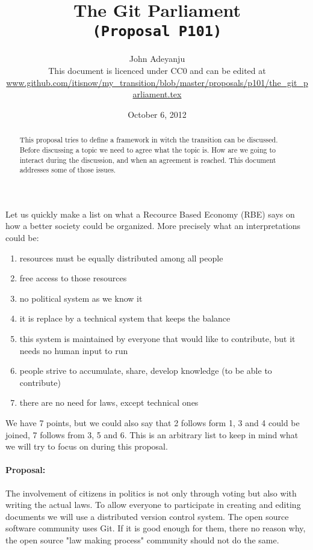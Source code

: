 \documentclass{article}
\begin{document}
\title{The Git Parliament\\\tt{\small{(Proposal P101)}}\\\tt{\small{}}}%
\author{John Adeyanju\\\small{This document is licenced under CC0 and can be edited at}\\ \scriptsize{\url{www.github.com/itisnow/my_transition/blob/master/proposals/p101/the_git_parliament.tex}}}
\date{October 6, 2012}

\maketitle

\begin{abstract}
This proposal tries to define a framework in witch the transition can be discussed.
Before discussing a topic we need to agree what the topic is.
How are we going to interact during the discussion, and when an agreement is reached.
This document addresses some of those issues.
\end{abstract}

Let us quickly make a list on what a Recource Based Economy (RBE)\cite{rbe}\cite{tzfs} says on how a better society could be organized.
More precisely what an interpretations could be:
\begin{enumerate}
\item resources must be equally distributed among all people
\item free access to those resources
\item no political system as we know it
\item it is replace by a technical system that keeps the balance
\item this system is maintained by everyone that would like to contribute, but it needs no human input to run
\item people strive to accumulate, share, develop knowledge (to be able to contribute)
\item there are no need for laws, except technical ones
\end{enumerate}
We have 7 points, but we could also say that 2 follows form 1, 3 and 4 could be joined, 7 follows from 3, 5 and 6.
This is an arbitrary list to keep in mind what we will try to focus on during this proposal.

\paragraph{Proposal:}
The involvement of citizens in politics is not only through voting but also with writing the actual laws.
To allow everyone to participate in creating and editing documents we will use a distributed version control system.
The open source software community uses Git.
If it is good enough for them, there no reason why, the open source "law making process" community should not do the same.
\end{document}
